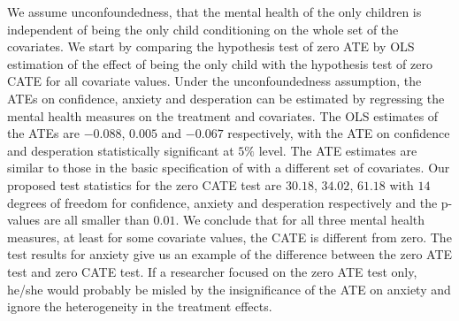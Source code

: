 \documentclass[
  12pt,
  12pt]{article}
\numberwithin{equation}{section}
\theoremstyle{definition}
\theoremstyle{plain}
\theoremstyle{plain}
\theoremstyle{remark}
\begin{document}
We assume unconfoundedness, that the mental health of the only children
is independent of being the only child conditioning on the whole set of
the covariates. We start by comparing the hypothesis test of zero ATE by
OLS estimation of the effect of being the only child with the hypothesis
test of zero CATE for all covariate values. Under the unconfoundedness
assumption, the ATEs on confidence, anxiety and desperation can be
estimated by regressing the mental health measures on the treatment and
covariates. The OLS estimates of the ATEs are \(-0.088\), \(0.005\) and
\(-0.067\) respectively, with the ATE on confidence and desperation
statistically significant at \(5\%\) level. The ATE estimates are
similar to those in the basic specification of \citet{wu2014only} with a
different set of covariates. Our proposed test statistics for the zero
CATE test are \(30.18\), \(34.02\), \(61.18\) with \(14\) degrees of
freedom for confidence, anxiety and desperation respectively and the
p-values are all smaller than \(0.01\). We conclude that for all three
mental health measures, at least for some covariate values, the CATE is
different from zero. The test results for anxiety give us an example of
the difference between the zero ATE test and zero CATE test. If a
researcher focused on the zero ATE test only, he/she would probably be
misled by the insignificance of the ATE on anxiety and ignore the
heterogeneity in the treatment effects.
\end{document}
